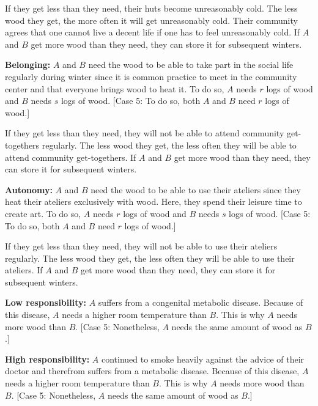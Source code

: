 \documentclass[egregdoesnotlikesansseriftitles]{scrartcl}
\begin{document}
If they get less than they need, their huts become unreasonably cold.
The less wood they get, the more often it will get unreasonably cold.
Their community agrees that one cannot live a decent life if one has to feel unreasonably cold.
If $A$ and $B$ get more wood than they need, they can store it for subsequent winters.\vspace{2ex}

\noindent\textbf{Belonging:} $A$ and $B$ need the wood to be able to take part in the social life regularly during winter since it is common practice to meet in the community center and that everyone brings wood to heat it.
To do so, $A$ needs $r$ logs of wood and $B$ needs $s$ logs of wood.
[Case 5: To do so, both $A$ and $B$ need $r$ logs of wood.]

If they get less than they need, they will not be able to attend community get-togethers regularly.
The less wood they get, the less often they will be able to attend community get-togethers.
If $A$ and $B$ get more wood than they need, they can store it for subsequent winters.\vspace{2ex}

\noindent\textbf{Autonomy:} $A$ and $B$ need the wood to be able to use their ateliers since they heat their ateliers exclusively with wood.
Here, they spend their leisure time to create art.
To do so, $A$ needs $r$ logs of wood and $B$ needs $s$ logs of wood.
[Case 5: To do so, both $A$ and $B$ need $r$ logs of wood.]

If they get less than they need, they will not be able to use their ateliers regularly.
The less wood they get, the less often they will be able to use their ateliers.
If $A$ and $B$ get more wood than they need, they can store it for subsequent winters.\vspace{2ex}

\noindent\textbf{Low responsibility:} $A$ suffers from a congenital metabolic disease.
Because of this disease, $A$ needs a higher room temperature than $B$.
This is why $A$ needs more wood than $B$.
[Case 5: Nonetheless, $A$ needs the same amount of wood as $B$.]\vspace{2ex}

\noindent\textbf{High responsibility:}
$A$ continued to smoke heavily against the advice of their doctor and therefrom suffers from a metabolic disease.
Because of this disease, $A$ needs a higher room temperature than $B$.
This is why $A$ needs more wood than $B$.
[Case 5: Nonetheless, $A$ needs the same amount of wood as $B$.]\vspace{2ex}
\end{document}
